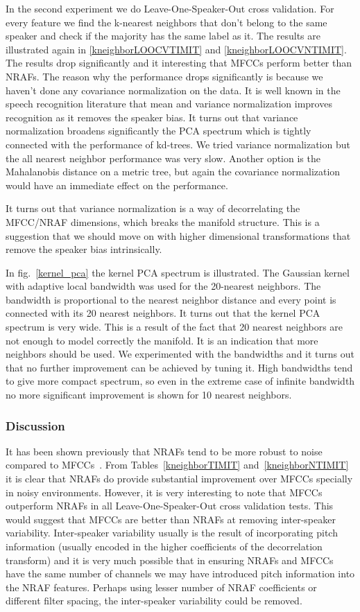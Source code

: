 \documentclass[12pt,letterpaper,doublespaced,ETD,dvips,proposal]{gtthesis}
\begin{document}
\begin{Body}
In the second experiment we do Leave-One-Speaker-Out cross
validation. For every feature we find the k-nearest neighbors that
don't belong to the same speaker and check if the majority has the
same label as it. The results are illustrated again in
\ref{kneighborLOOCVTIMIT} and \ref{kneighborLOOCVNTIMIT}. The
results drop significantly and it interesting that MFCCs perform
better than NRAFs. The reason why the performance drops
significantly is because we haven't done any covariance
normalization on the data. It is well known in the speech
recognition literature that mean and variance normalization improves
recognition as it removes the speaker bias. It turns out that
variance normalization broadens significantly the PCA spectrum which
is tightly connected with the performance of kd-trees. We tried
variance normalization but the all nearest neighbor performance was
very slow. Another option is the Mahalanobis distance on a metric
tree, but again the covariance normalization would have an immediate
effect on the performance.

It turns out that variance normalization is a way of decorrelating
the MFCC/NRAF dimensions, which breaks the manifold structure. This
is a suggestion that we should move on with higher dimensional
transformations that remove the speaker bias intrinsically.

In fig.~\ref{kernel_pca} the kernel PCA spectrum is illustrated. The
Gaussian kernel with adaptive local bandwidth was used for the
20-nearest neighbors. The bandwidth is proportional to the nearest
neighbor distance and every point is connected with its 20 nearest
neighbors. It turns out that the kernel PCA spectrum is very wide.
This is a result of the fact that 20 nearest neighbors are not
enough to model correctly the manifold. It is an indication that
more neighbors should be used. We experimented with the bandwidths
and it turns out that no further improvement can be achieved by
tuning it. High bandwidths tend to give more compact spectrum, so
even in the extreme case of infinite bandwidth no more significant
improvement is shown for 10 nearest neighbors.

\subsubsection{Discussion} It has been shown previously that NRAFs
tend to be more robust to noise compared to
MFCCs~\cite{ravindran:inr}. From Tables~\ref{kneighborTIMIT}
and~\ref{kneighborNTIMIT} it is clear that NRAFs do provide
substantial improvement over MFCCs specially in noisy environments.
However, it is very interesting to note that MFCCs outperform NRAFs
in all Leave-One-Speaker-Out cross validation tests. This would
suggest that MFCCs are better than NRAFs at removing inter-speaker
variability. Inter-speaker variability usually is the result of
incorporating pitch information (usually encoded in the higher
coefficients of the decorrelation transform) and it is very much
possible that in ensuring NRAFs and MFCCs have the same number of
channels we may have introduced pitch information into the NRAF
features. Perhaps using lesser number of NRAF coefficients or
different filter spacing, the inter-speaker variability could be
removed.



\end{Body}
\end{document}
